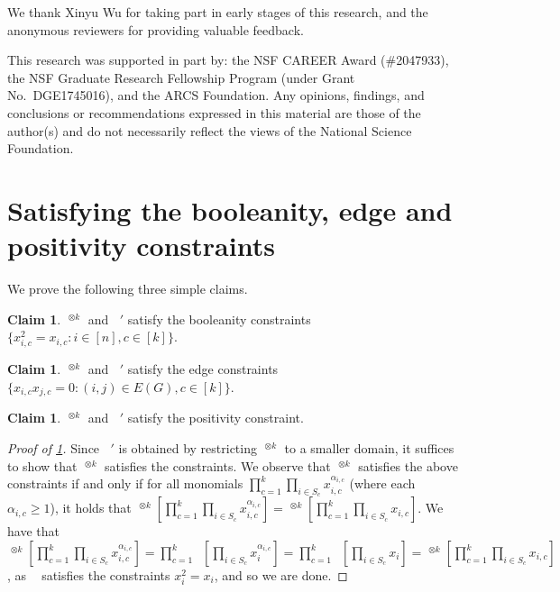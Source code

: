 \documentclass[10pt,a4paper]{article}
\theoremstyle{definition}
\newtheorem{claim}[theorem]{Claim}
\DeclareMathOperator{\pE}{\tilde{\mathbb{E}}}
\newcommand{\numcolors}{k}
\begin{document}
We thank Xinyu Wu for taking part in early stages of this research, and the anonymous reviewers for providing valuable feedback.

This research was supported in part by:
the NSF CAREER Award (\#2047933),
the NSF Graduate Research Fellowship Program (under Grant No.\ DGE1745016),
and
the ARCS Foundation.
Any opinions, findings, and conclusions or recommendations expressed in this material are those of the author(s) and do not necessarily reflect the views of the National Science Foundation.














\appendix


\section{Satisfying the booleanity, edge and positivity constraints}
\label{appendix:edgepsd}
We prove the following three simple claims.

\begin{claim}
\label{claim:bool}
$\pE^{\otimes \numcolors}$ and $\pE'$ satisfy the booleanity constraints $\{x_{i,c}^2 =  x_{i,c} : i \in [n], c \in [\numcolors]\}$.
\end{claim}
\begin{claim}
\label{claim:edge}
$\pE^{\otimes \numcolors}$ and $\pE'$ satisfy the edge constraints $\{x_{i,c} x_{j,c} = 0 : (i,j) \in E(G), c \in [\numcolors]\}$.
\end{claim}

\begin{claim}
\label{claim:psd}
$\pE^{\otimes \numcolors}$ and $\pE'$ satisfy the positivity constraint.
\end{claim}

\begin{proof}[Proof of \cref{claim:bool}]
Since $\pE'$ is obtained by restricting $\pE^{\otimes \numcolors}$ to a smaller domain, it suffices to show that $\pE^{\otimes \numcolors}$ satisfies the constraints. We observe that $\pE^{\otimes \numcolors}$ satisfies the above constraints if and only if for all monomials $\prod_{c = 1}^\numcolors \prod_{i \in S_c} x_{i,c}^{\alpha_{i,c}}$ (where each $\alpha_{i,c} \geq 1$), it holds that $\pE^{\otimes \numcolors}[\prod_{c = 1}^\numcolors \prod_{i \in S_c} x_{i,c}^{\alpha_{i,c}}] = \pE^{\otimes \numcolors}[\prod_{c = 1}^\numcolors \prod_{i \in S_c} x_{i,c}]$. We have that $\pE^{\otimes \numcolors}[\prod_{c = 1}^\numcolors \prod_{i \in S_c} x_{i,c}^{\alpha_{i,c}}] = \prod_{c = 1}^\numcolors \pE[\prod_{i \in S_c} x_{i}^{\alpha_{i,c}}] = \prod_{c = 1}^\numcolors \pE[\prod_{i \in S_c} x_{i}] = \pE^{\otimes \numcolors}[\prod_{c = 1}^\numcolors \prod_{i \in S_c} x_{i,c}]$, as $\pE$ satisfies the constraints $x_i^2 = x_i$, and so we are done.
\end{proof}
\end{document}
